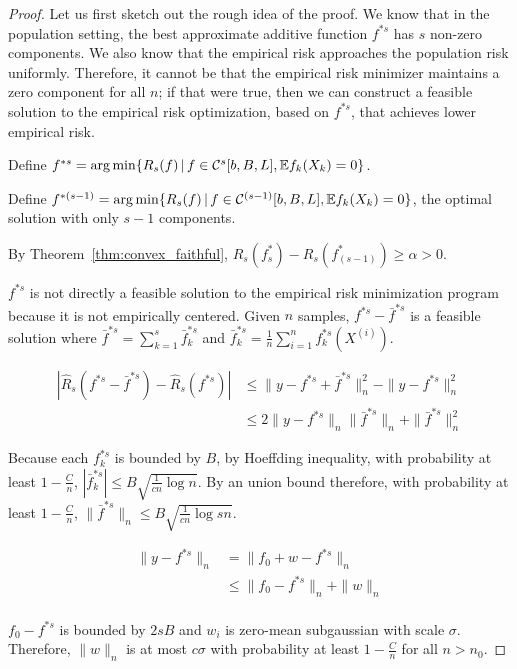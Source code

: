 \begin{proof}
Let us first sketch out the rough idea of the proof. We know that in the population setting, the best approximate additive function $f^{*s}$ has $s$ non-zero components. We also know that the empirical risk approaches the population risk uniformly. Therefore, it cannot be that the empirical risk minimizer maintains a zero component for all $n$; if that were true, then we can construct a feasible solution to the empirical risk optimization, based on $f^{*s}$, that achieves lower empirical risk. 

Define $f^{*s} = \arg\min \{ R_s(f) \,|\, f \in \mathcal{C}^s[b,B,L], {\mathbb E} f_k(X_k) = 0\}$.

Define $f^{*(s-1)} = \arg\min \{ R_s(f) \,|\, f \in \mathcal{C}^{(s-1)}[b,B,L], {\mathbb E} f_k(X_k) = 0\}$, the optimal solution with only $s-1$ components.

By Theorem~\ref{thm:convex_faithful}, $R_s(f^*_s) - R_s(f^*_{(s-1)}) \geq \alpha > 0$.

$f^{*s}$ is not directly a feasible solution to the empirical risk minimization program because it is not empirically centered. Given $n$ samples, $f^{*s} - \bar{f}^{*s}$ is a feasible solution where $\bar{f}^{*s} = \sum_{k=1}^s \bar{f}_k^{*s}$ and $\bar{f}_k^{*s} = \frac{1}{n} \sum_{i=1}^n f_k^{*s}(X^{(i)})$. 

\begin{align*}
|\hat{R}_s(f^{*s} - \bar{f}^{*s}) - \hat{R}_s(f^{*s})| &\leq \| y - f^{*s} + \bar{f}^{*s} \|_n^2  - \| y - f^{*s}\|_n^2 \\
	&\leq 2\|y-f^{*s}\|_n \|\bar{f}^{*s}\|_n + \|\bar{f}^{*s}\|_n^2 
\end{align*}

Because each $f_k^{*s}$ is bounded by $B$, by Hoeffding inequality, with probability at least $1-\frac{C}{n}$, $|\bar{f}_k^{*s}| \leq B\sqrt{\frac{1}{cn} \log n}$. By an union bound therefore, with probability at least $1-\frac{C}{n}$, $\|\bar{f}^{*s}\|_n \leq B\sqrt{\frac{1}{cn} \log sn}$.

\begin{align*}
\| y - f^{*s} \|_n &= \| f_0 + w - f^{*s} \|_n \\
	&\leq \| f_0 - f^{*s} \|_n + \|w\|_n \\
\end{align*}

$f_0 - f^{*s}$ is bounded by $2sB$ and $w_i$ is zero-mean subgaussian with scale $\sigma$. Therefore, $\|w\|_n$ is at most $c\sigma$ with probability at least $1-\frac{C}{n}$ for all $n > n_0$. 


\end{proof}
